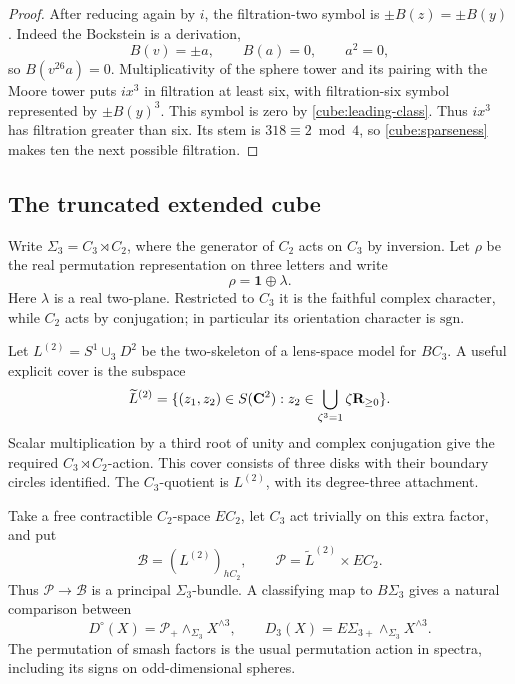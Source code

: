 \begin{proof}
After reducing again by \(i\), the filtration-two symbol is
\(\pm B(z)=\pm B(y)\).  Indeed the Bockstein is a derivation,
\[
 B(v)=\pm a,\qquad B(a)=0,\qquad a^2=0,
\]
so \(B(v^{26}a)=0\).  Multiplicativity of the sphere tower and its
pairing with the Moore tower puts \(ix^3\) in filtration at least
six, with filtration-six symbol represented by \(\pm B(y)^3\).
This symbol is zero by \eqref{cube:leading-class}.  Thus \(ix^3\)
has filtration greater than six.  Its stem is \(318\equiv2\bmod4\),
so \eqref{cube:sparseness} makes ten the next possible filtration.
\end{proof}

\subsection{The truncated extended cube}

Write \(\Sigma_3=C_3\rtimes C_2\), where the generator of \(C_2\)
acts on \(C_3\) by inversion.  Let \(\rho\) be the real permutation
representation on three letters and write
\[
 \rho=\mathbf1\oplus\lambda.
\]
Here \(\lambda\) is a real two-plane.  Restricted to \(C_3\) it is
the faithful complex character, while \(C_2\) acts by conjugation;
in particular its orientation character is \(\mathrm{sgn}\).

Let \(L^{(2)}=S^1\cup_3D^2\) be the two-skeleton of a lens-space
model for \(BC_3\).  A useful explicit cover is the subspace
\[
 \widetilde L^{(2)}
 =\{(z_1,z_2)\in S(\mathbf C^2):
       z_2\in\bigcup_{\zeta^3=1}\zeta\mathbf R_{\geq0}\}.
\]
Scalar multiplication by a third root of unity and complex
conjugation give the required \(C_3\rtimes C_2\)-action.  This
cover consists of three disks with their boundary circles
identified.  The \(C_3\)-quotient is \(L^{(2)}\), with its
degree-three attachment.

Take a free contractible \(C_2\)-space \(EC_2\), let \(C_3\) act
trivially on this extra factor, and put
\[
 \mathcal B=(L^{(2)})_{hC_2},\qquad
 \mathcal P=\widetilde L^{(2)}\times EC_2.
\]
Thus \(\mathcal P\to\mathcal B\) is a principal \(\Sigma_3\)-bundle.
A classifying map to \(B\Sigma_3\) gives a natural comparison
between
\begin{equation}\label{cube:truncated-functor}
 D^\circ(X)=\mathcal P_+\wedge_{\Sigma_3}X^{\wedge3},
 \qquad
 D_3(X)=E\Sigma_{3+}\wedge_{\Sigma_3}X^{\wedge3}.
\end{equation}
The permutation of smash factors is the usual permutation action
in spectra, including its signs on odd-dimensional spheres.

